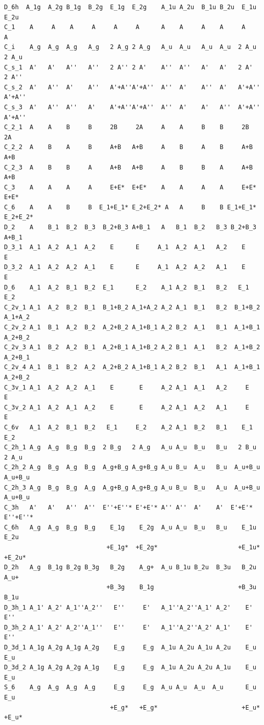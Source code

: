 \documentclass[12pt,a4paper,twoside]{report}
\begin{document}
\begin{tcolorbox}
\begin{scriptsize}
\begin{verbatim}
D_6h  A_1g  A_2g B_1g  B_2g  E_1g  E_2g    A_1u A_2u  B_1u B_2u  E_1u  E_2u
C_1    A     A    A     A     A     A      A    A     A    A     A     A
C_i    A_g  A_g  A_g   A_g   2 A_g 2 A_g   A_u  A_u   A_u  A_u  2 A_u  2 A_u
C_s_1  A'   A'   A''   A''   2 A'' 2 A'    A''  A''   A'   A'   2 A'   2 A'' 
C_s_2  A'   A''  A'    A''   A'+A''A'+A''  A''  A'    A''  A'   A'+A'' A'+A''
C_s_3  A'   A''  A''   A'    A'+A''A'+A''  A''  A'    A'   A''  A'+A'' A'+A'' 
C_2_1  A    A    B     B     2B     2A     A    A     B    B     2B     2A
C_2_2  A    B    A     B     A+B   A+B     A    B     A    B     A+B    A+B
C_2_3  A    B    B     A     A+B   A+B     A    B     B    A     A+B    A+B
C_3    A    A    A     A     E+E*  E+E*    A    A     A    A     E+E*   E+E*
C_6    A    A    B     B  E_1+E_1* E_2+E_2* A   A     B    B E_1+E_1* E_2+E_2*
D_2    A    B_1  B_2  B_3  B_2+B_3 A+B_1   A   B_1  B_2   B_3 B_2+B_3 A+B_1 
D_3_1  A_1  A_2  A_1  A_2    E      E     A_1  A_2  A_1   A_2    E      E
D_3_2  A_1  A_2  A_2  A_1    E      E     A_1  A_2  A_2   A_1    E      E
D_6    A_1  A_2  B_1  B_2  E_1      E_2    A_1 A_2  B_1   B_2   E_1    E_2
C_2v_1 A_1  A_2  B_2  B_1  B_1+B_2 A_1+A_2 A_2 A_1  B_1   B_2  B_1+B_2 A_1+A_2
C_2v_2 A_1  B_1  A_2  B_2  A_2+B_2 A_1+B_1 A_2 B_2  A_1   B_1  A_1+B_1 A_2+B_2
C_2v_3 A_1  B_2  A_2  B_1  A_2+B_1 A_1+B_2 A_2 B_1  A_1   B_2  A_1+B_2 A_2+B_1
C_2v_4 A_1  B_1  B_2  A_2  A_2+B_2 A_1+B_1 A_2 B_2  B_1   A_1  A_1+B_1 A_2+B_2
C_3v_1 A_1  A_2  A_2  A_1    E       E     A_2 A_1  A_1   A_2     E      E
C_3v_2 A_1  A_2  A_1  A_2    E       E     A_2 A_1  A_2   A_1     E      E
C_6v   A_1  A_2  B_1  B_2   E_1     E_2    A_2 A_1  B_2   B_1    E_1    E_2
C_2h_1 A_g  A_g  B_g  B_g  2 B_g   2 A_g   A_u A_u  B_u   B_u   2 B_u  2 A_u 
C_2h_2 A_g  B_g  A_g  B_g  A_g+B_g A_g+B_g A_u B_u  A_u   B_u  A_u+B_u A_u+B_u
C_2h_3 A_g  B_g  B_g  A_g  A_g+B_g A_g+B_g A_u B_u  B_u   A_u  A_u+B_u A_u+B_u
C_3h   A'   A'   A''  A''  E''+E''* E'+E'* A'' A''  A'    A'  E'+E'* E''+E''*
C_6h   A_g  A_g  B_g  B_g    E_1g    E_2g  A_u A_u  B_u   B_u    E_1u    E_2u
                            +E_1g*  +E_2g*                      +E_1u*  +E_2u*
D_2h   A_g  B_1g B_2g B_3g   B_2g    A_g+  A_u B_1u B_2u  B_3u   B_2u    A_u+
                            +B_3g    B_1g                       +B_3u    B_1u
D_3h_1 A_1' A_2' A_1''A_2''   E''     E'   A_1''A_2''A_1' A_2'    E'     E''
D_3h_2 A_1' A_2' A_2''A_1''   E''     E'   A_1''A_2''A_2' A_1'    E'     E''
D_3d_1 A_1g A_2g A_1g A_2g    E_g     E_g  A_1u A_2u A_1u A_2u    E_u    E_u
D_3d_2 A_1g A_2g A_2g A_1g    E_g     E_g  A_1u A_2u A_2u A_1u    E_u    E_u
S_6    A_g  A_g  A_g  A_g     E_g     E_g  A_u A_u  A_u  A_u      E_u    E_u
                             +E_g*   +E_g*                       +E_u*  +E_u*
\end{verbatim}
\end{scriptsize}
\end{tcolorbox}
\end{document}
